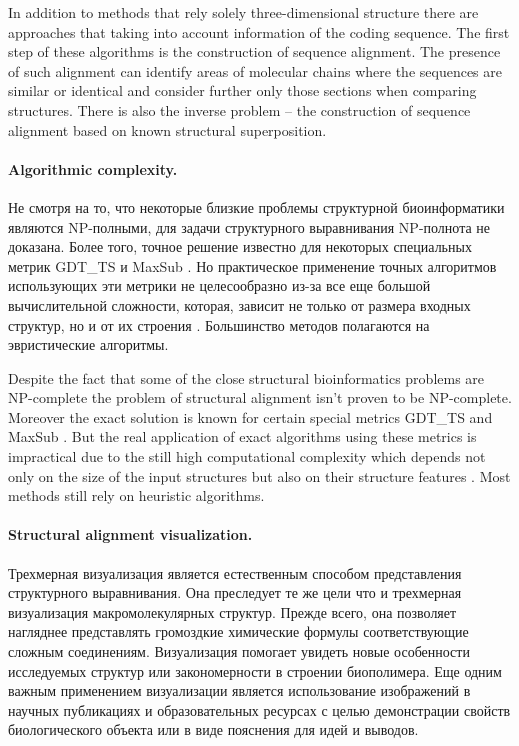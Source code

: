 \documentclass[a4paper, 12pt, titlepage, utf8]{extarticle}
\begin{document}
In addition to methods that rely solely three-dimensional structure there are
approaches that  taking into account information of the coding sequence. The
first step of these algorithms is the construction of sequence alignment. The
presence of such alignment can identify areas of molecular chains where the
sequences are similar or identical and consider further only those sections when
comparing structures. There is also the inverse problem -- the construction of
sequence alignment based on known structural superposition.

\paragraph{Algorithmic complexity.}
\begin{original}
Не смотря на то, что некоторые близкие проблемы структурной биоинформатики
являются NP-полными, для задачи структурного выравнивания NP-полнота не
доказана. Более того, точное решение известно для некоторых специальных метрик
GDT\_TS \cite{wiki-2} и MaxSub \cite{wiki-11}. Но практическое применение точных
алгоритмов использующих эти метрики не целесообразно из-за все еще большой
вычислительной сложности, которая, зависит не только от размера входных
структур, но и от их строения  \cite{wiki-12}. Большинство методов полагаются на
эвристические алгоритмы.
\end{original}

Despite the fact that some of the close structural bioinformatics problems are
NP-complete  the problem of structural alignment isn't proven to be NP-complete.
Moreover the exact solution is known for certain special metrics GDT\_TS
\cite{wiki-2} and MaxSub \cite{wiki-11}. But the real application of exact
algorithms using these metrics is impractical due to the still high
computational complexity which depends not only on the size of the input
structures but also on their structure features \cite{wiki-12}. Most methods
still rely on heuristic algorithms.

\paragraph{Structural alignment visualization.}
\begin{original}
Трехмерная визуализация является естественным способом представления
структурного выравнивания. Она преследует те же цели что и трехмерная
визуализация макромолекулярных структур. Прежде всего, она позволяет нагляднее
представлять громоздкие химические формулы соответствующие сложным соединениям.
Визуализация помогает увидеть новые особенности исследуемых структур или
закономерности в строении биополимера. Еще одним важным применением визуализации
является использование изображений в научных публикациях и образовательных
ресурсах с целью демонстрации свойств биологического объекта или в виде
пояснения для идей и выводов.
\end{original}
\end{document}
